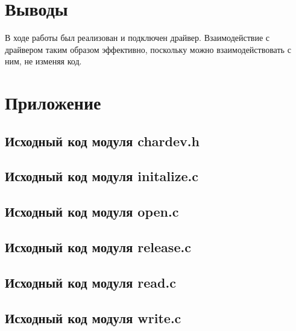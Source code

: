 \documentclass[a4paper,11pt]{article}
\begin{document}
\section{Выводы}
  В ходе работы был реализован и подключен драйвер.
  Взаимодействие с драйвером таким образом эффективно, поскольку можно взаимодействовать с ним, не изменяя код.
  \newpage

\section{Приложение}
  \subsection{Исходный код модуля chardev.h}
    
  \subsection{Исходный код модуля initalize.c}
    
  \subsection{Исходный код модуля open.c}
    
  \subsection{Исходный код модуля release.c}
    
  \subsection{Исходный код модуля read.c}
    
  \subsection{Исходный код модуля write.c}
    
\end{document}
